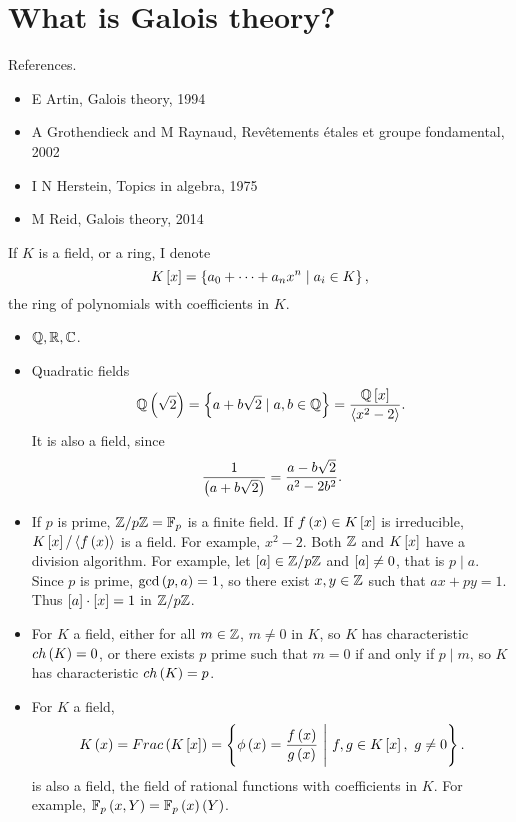 

\section{What is Galois theory?}


References.
\begin{itemize}
\item E Artin, Galois theory, 1994
\item A Grothendieck and M Raynaud, Rev\^etements \'etales et groupe fondamental, 2002
\item I N Herstein, Topics in algebra, 1975
\item M Reid, Galois theory, 2014
\end{itemize}

\begin{notation*}
If $ K $ is a field, or a ring, I denote
$$ K\sb{x} = \cb{a_0 + \dots + a_nx^n \mid a_i \in K}, $$
the ring of polynomials with coefficients in $ K $.
\end{notation*}

\begin{example*}
\hfill
\begin{itemize}
\item $ \Q, \R, \C $.
\item Quadratic fields
$$ \Q\rb{\sqrt{2}} = \cb{a + b\sqrt{2} \mid a, b \in \Q} = \dfrac{\Q\sb{x}}{\ab{x^2 - 2}}. $$
It is also a field, since
$$ \dfrac{1}{\rb{a + b\sqrt{2}}} = \dfrac{a - b\sqrt{2}}{a^2 - 2b^2}. $$
\item If $ p $ is prime, $ \Z / p\Z = \F_p $ is a finite field. If $ f\rb{x} \in K\sb{x} $ is irreducible, $ K\sb{x} / \ab{f\rb{x}} $ is a field. For example, $ x^2 - 2 $. Both $ \Z $ and $ K\sb{x} $ have a division algorithm. For example, let $ \sb{a} \in \Z / p\Z $ and $ \sb{a} \ne 0 $, that is $ p \mid a $. Since $ p $ is prime, $ \gcd\rb{p, a} = 1 $, so there exist $ x, y \in \Z $ such that $ ax + py = 1 $. Thus $ \sb{a} \cdot \sb{x} = 1 $ in $ \Z / p\Z $.
\item For $ K $ a field, either for all $ m \in \Z $, $ m \ne 0 $ in $ K $, so $ K $ has characteristic $ ch\rb{K} = 0 $, or there exists $ p $ prime such that $ m = 0 $ if and only if $ p \mid m $, so $ K $ has characteristic $ ch\rb{K} = p $.
\item For $ K $ a field,
$$ K\rb{x} = Frac\rb{K\sb{x}} = \cb{\phi\rb{x} = \dfrac{f\rb{x}}{g\rb{x}} \ \Bigg| \ f, g \in K\sb{x}, \ g \ne 0}. $$
is also a field, the field of rational functions with coefficients in $ K $. For example, $ \F_p\rb{x, Y} = \F_p\rb{x}\rb{Y} $.
\end{itemize}
\end{example*}

